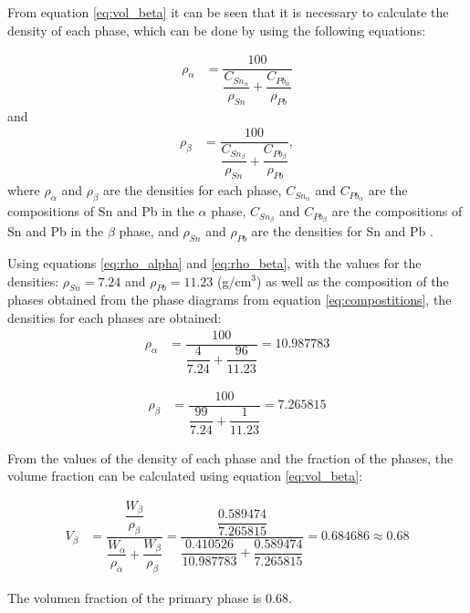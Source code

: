 From equation \eqref{eq:vol_beta} it can be seen that it is necessary to calculate the density of each phase, which can be done by using the following equations:

\begin{align}
    \label{eq:rho_alpha}
    \rho_{\alpha}&=\dfrac{100}{\dfrac{C_{Sn_{\alpha}}}{\rho_{Sn}}+\dfrac{C_{Pb_{\alpha}}}{\rho_{Pb}}}
\end{align}
and
\begin{align}
    \label{eq:rho_beta}
    \rho_{\beta}&=\dfrac{100}{\dfrac{C_{Sn_{\beta}}}{\rho_{Sn}}+\dfrac{C_{Pb_{\beta}}}{\rho_{Pb}}},
\end{align}
where $\rho_{\alpha}$ and $\rho_{\beta}$ are the densities for each phase, $C_{Sn_{\alpha}}$ and $C_{Pb_{\alpha}}$ are the compositions of Sn and Pb in the $\alpha$ phase, $C_{Sn_{\beta}}$ and $C_{Pb_{\beta}}$ are the compositions of Sn and Pb in the $\beta$ phase, and $\rho_{Sn}$ and $\rho_{Pb}$ are the densities for Sn and Pb \citep[p.~97]{callister2010materials}.

Using equations \eqref{eq:rho_alpha} and \eqref{eq:rho_beta}, with the values for the densities: $\rho_{Sn}=7.24$ and $\rho_{Pb}=11.23$ (g/cm$^3$) \citep[p.~302]{callister2010materials} as well as the composition of the phases obtained from the phase diagrams from equation \ref{eq:compostitions}, the densities for each phases are obtained:
\begin{align}
    \label{eq:rho_alpha_num}
    \rho_{\alpha}&=\dfrac{100}{\dfrac{4}{7.24}+\dfrac{96}{11.23}}=10.987783
\end{align}

\begin{align}
    \label{eq:rho_beta_num}
    \rho_{\beta}&=\dfrac{100}{\dfrac{99}{7.24}+\dfrac{1}{11.23}}=7.265815
\end{align}

From the values of the density of each phase and the fraction of the phases, the volume fraction can be calculated using equation \eqref{eq:vol_beta}:

\begin{align}
    \label{eq:vol_beta_num}
    V_{\beta}&=\dfrac{\dfrac{W_{\beta}}{\rho_{\beta}}}{\dfrac{W_{\alpha}}{\rho_{\alpha}}+\dfrac{W_{\beta}}{\rho_{\beta}}}=\dfrac{\dfrac{0.589474}{7.265815}}{\dfrac{0.410526}{10.987783}+\dfrac{0.589474}{7.265815}}=0.684686\approx 0.68
\end{align}

\begin{mdframed}
The volumen fraction of the primary phase is 0.68.
\end{mdframed}

